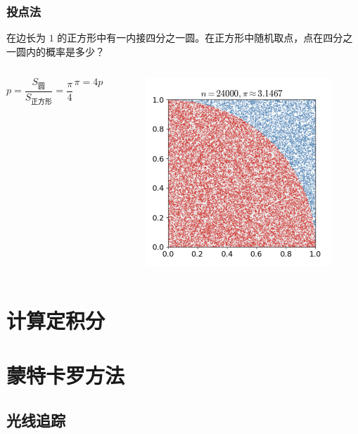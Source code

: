 \documentclass{beamer}
\begin{document}
\begin{frame}
    \frametitle{投点法}

    \begin{problem}
        在边长为 $1$ 的正方形中有一内接四分之一圆。在正方形中随机取点，点在四分之一圆内的概率是多少？   
    \end{problem}

    \begin{columns}

        $$p = \frac{S_{\text{圆}}}{S_{\text{正方形}}} = \frac{\pi}{4}$$
    
        $$\pi = 4p$$


        \begin{figure}
            \centering
            \includegraphics[scale=0.12]{res/pi_calc.png}
        \end{figure}
    \end{columns}

\end{frame}

\section{计算定积分}

\section{蒙特卡罗方法}

\subsection{光线追踪}

\begin{frame}
    \frametitle{}

    

\end{frame}
\end{document}
